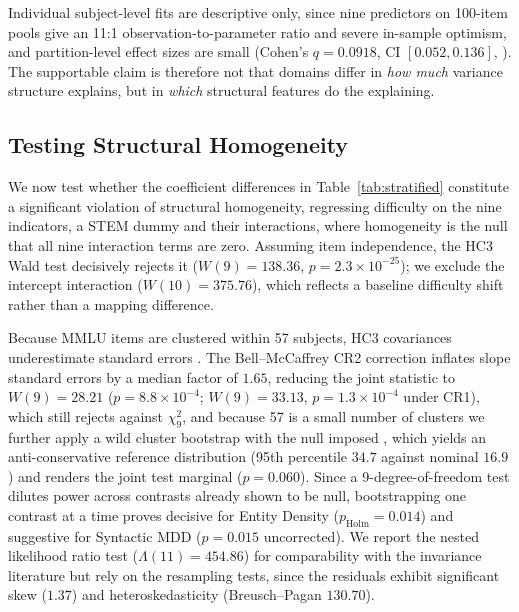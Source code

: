 Individual subject-level fits are descriptive only, since nine predictors on 100-item pools give an 11:1 observation-to-parameter ratio and severe in-sample optimism, and partition-level effect sizes are small (Cohen's $q = 0.0918$, CI $[0.052,0.136]$, \citealp{cohen1988}). The supportable claim is therefore not that domains differ in \emph{how much} variance structure explains, but in \emph{which} structural features do the explaining.

\subsection{Testing Structural Homogeneity}\label{sec:invariance}

We now test whether the coefficient differences in Table~\ref{tab:stratified} constitute a significant violation of structural homogeneity, regressing difficulty on the nine indicators, a STEM dummy and their interactions, where homogeneity is the null that all nine interaction terms are zero. Assuming item independence, the HC3 Wald test decisively rejects it ($W(9) = 138.36$, $p = 2.3 \times 10^{-25}$); we exclude the intercept interaction ($W(10) = 375.76$), which reflects a baseline difficulty shift rather than a mapping difference.

Because MMLU items are clustered within 57 subjects, HC3 covariances underestimate standard errors \citep{liang1986}. The Bell--McCaffrey CR2 correction \citep{bell2002} inflates slope standard errors by a median factor of $1.65$, reducing the joint statistic to $W(9) = 28.21$ ($p = 8.8 \times 10^{-4}$; $W(9) = 33.13$, $p = 1.3 \times 10^{-4}$ under CR1), which still rejects against $\chi_{9}^{2}$, and because 57 is a small number of clusters we further apply a wild cluster bootstrap with the null imposed \citep{cameron2008}, which yields an anti-conservative reference distribution (95th percentile $34.7$ against nominal $16.9$) and renders the joint test marginal ($p = 0.060$). Since a 9-degree-of-freedom test dilutes power across contrasts already shown to be null, bootstrapping one contrast at a time proves decisive for Entity Density ($p_{\text{Holm}} = 0.014$) and suggestive for Syntactic MDD ($p = 0.015$ uncorrected). We report the nested likelihood ratio test ($\Lambda(11) = 454.86$) for comparability with the invariance literature \citep{kline2016,wilks1938} but rely on the resampling tests, since the residuals exhibit significant skew ($1.37$) and heteroskedasticity (Breusch--Pagan $130.70$).

